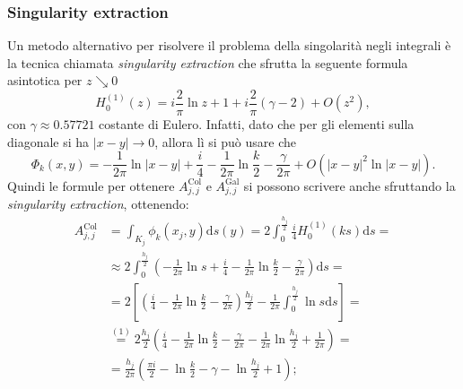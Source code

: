 \subsubsection{Singularity extraction} \label{SingularityExtraction}
Un metodo alternativo per risolvere il problema della singolarità negli integrali è la tecnica chiamata \textit{singularity extraction} che sfrutta la seguente formula asintotica per $z \searrow 0$
\begin{equation}
	H_0^{(1)}(z) = i\frac{2}{\pi}\ln z + 1 + i \frac{2}{\pi} (\gamma-2) + O(z^2),
\end{equation}
con $\gamma \approx 0.57721$ costante di Eulero. Infatti, dato che per gli elementi sulla diagonale si ha $|x-y| \rightarrow 0$, allora lì si può usare che
\begin{equation}
	\Phi_k(x,y) = -\frac{1}{2\pi}\ln|x-y| + \frac{i}{4} - \frac{1}{2\pi}\ln\frac{k}{2} - \frac{\gamma}{2\pi} + O(|x-y|^2\ln|x-y|).
\end{equation}
Quindi le formule per ottenere $A_{j,j}^{\text{Col}}$ e $A_{j,j}^{\text{Gal}}$ si possono scrivere anche sfruttando la \textit{singularity extraction}, ottenendo:
\begin{align*}
	A_{j,j}^{\text{Col}} &= \int_{K_j} \phi_k(x_j,y) \mathrm{d}s(y) = 2 \int_{0}^{\frac{h_j}{2}} \frac{i}{4} H_0^{(1)} (ks)\mathrm{d}s = \\
	&\approx 2 \int_{0}^{\frac{h_j}{2}} \left( -\frac{1}{2\pi} \ln s + \frac{i}{4} - \frac{1}{2\pi}\ln\frac{k}{2} - \frac{\gamma}{2\pi} \right) \mathrm{d}s = \\
	&= 2 \left[ \left( \frac{i}{4} - \frac{1}{2\pi}\ln\frac{k}{2} - \frac{\gamma}{2\pi} \right) \frac{h_j}{2} - \frac{1}{2\pi} \int_{0}^{\frac{h_j}{2}} \ln s \mathrm{d}s \right] = \\
	&\overset{(1)}{=} 2 \frac{h_j}{2} \left( \frac{i}{4} - \frac{1}{2\pi}\ln\frac{k}{2} - \frac{\gamma}{2\pi} - \frac{1}{2\pi}\ln\frac{h_j}{2} + \frac{1}{2\pi} \right) = \\
	&= \frac{h_j}{2\pi} \left( \frac{\pi i}{2} - \ln\frac{k}{2} - \gamma - \ln\frac{h_j}{2} + 1 \right);
\end{align*}

